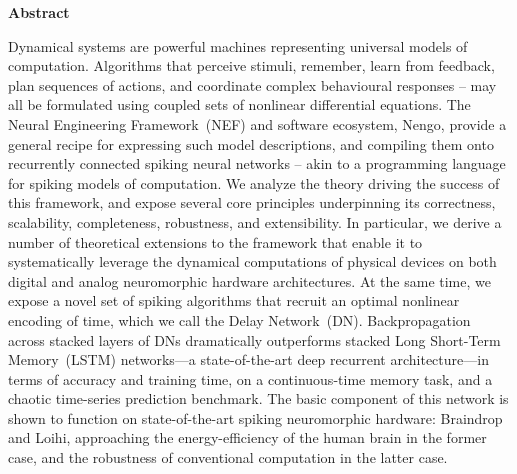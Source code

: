 {}
\begin{center}\textbf{Abstract}\end{center}

Dynamical systems are powerful machines representing universal models of computation.
Algorithms that perceive stimuli, remember, learn from feedback, plan sequences of actions, and coordinate complex behavioural responses -- may all be formulated using coupled sets of nonlinear differential equations.
The Neural Engineering Framework~(NEF) and software ecosystem, Nengo, provide a general recipe for expressing such model descriptions, and compiling them onto recurrently connected spiking neural networks -- akin to a programming language for spiking models of computation.
We analyze the theory driving the success of this framework, and expose several core principles underpinning its correctness, scalability, completeness, robustness, and extensibility.
In particular, we derive a number of theoretical extensions to the framework that enable it to systematically leverage the dynamical computations of physical devices on both digital and analog neuromorphic hardware architectures.
At the same time, we expose a novel set of spiking algorithms that recruit an optimal nonlinear encoding of time, which we call the Delay Network~(DN).
Backpropagation across stacked layers of DNs dramatically outperforms stacked Long Short-Term Memory~(LSTM) networks---a state-of-the-art deep recurrent architecture---in terms of accuracy and training time, on a continuous-time memory task, and a chaotic time-series prediction benchmark.
The basic component of this network is shown to function on state-of-the-art spiking neuromorphic hardware: Braindrop and Loihi, approaching the energy-efficiency of the human brain in the former case, and the robustness of conventional computation in the latter case.

\cleardoublepage
